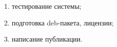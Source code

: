 \begin{enumerate}
\item тестирование системы;
\item подготовка deb-пакета, лицензии;
\item написание публикации.
\end{enumerate}
